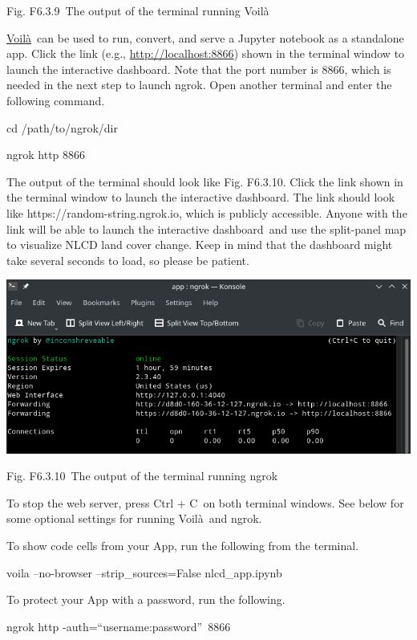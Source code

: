\documentclass[
  letterpaper,
  DIV=11,
  numbers=noendperiod]{scrreprt}
\begin{document}
Fig. F6.3.9~The output of the terminal running Voilà

\href{https://www.google.com/url?q=https://voila.readthedocs.io/en/stable/\&sa=D\&source=editors\&ust=1671458841329454\&usg=AOvVaw16GCXDSkxu4fUl6f6LFafy}{Voilà}~can
be used to run, convert, and serve a Jupyter notebook as a standalone
app. Click the link (e.g.,
\href{https://www.google.com/url?q=http://localhost:8866\&sa=D\&source=editors\&ust=1671458841329837\&usg=AOvVaw052EvlmJeJTl9zIHvFobLl}{http://localhost:8866})
shown in the terminal window to launch the interactive dashboard. Note
that the port number is 8866, which is needed in the next step to launch
ngrok. Open another terminal and enter the following command.

cd /path/to/ngrok/dir

ngrok http 8866

The output of the terminal should look like Fig. F6.3.10. Click the link
shown in the terminal window to launch the interactive dashboard. The
link should look like https://random-string.ngrok.io, which is publicly
accessible. Anyone with the link will be able to launch the interactive
dashboard~and use the split-panel map to visualize NLCD land cover
change. Keep in mind that the dashboard might take several seconds to
load, so please be patient.

\includegraphics{./F6/image8.png}

Fig. F6.3.10~The output of the terminal running ngrok

To stop the web server, press Ctrl + C~on both terminal windows. See
below for some optional settings for running Voilà~and ngrok.

To show code cells from your App, run the following from the terminal.

voila --no-browser --strip\_sources=False nlcd\_app.ipynb

To protect your App with a password, run the following.

ngrok http -auth=``username:password''~8866
\end{document}
